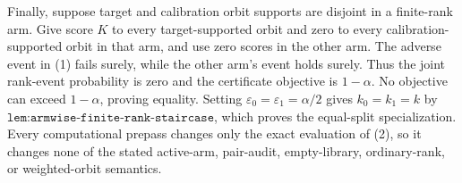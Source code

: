 Finally, suppose target and calibration orbit supports are disjoint in a finite-rank arm. Give score \(K\) to every target-supported orbit and zero to every calibration-supported orbit in that arm, and use zero scores in the other arm. The adverse event in (1) fails surely, while the other arm's event holds surely. Thus the joint rank-event probability is zero and the certificate objective is \(1-\alpha\). No objective can exceed \(1-\alpha\), proving equality. Setting \(\varepsilon_0=\varepsilon_1=\alpha/2\) gives \(k_0=k_1=k\) by \(\texttt{lem:armwise-finite-rank-staircase}\), which proves the equal-split specialization. Every computational prepass changes only the exact evaluation of (2), so it changes none of the stated active-arm, pair-audit, empty-library, ordinary-rank, or weighted-orbit semantics.